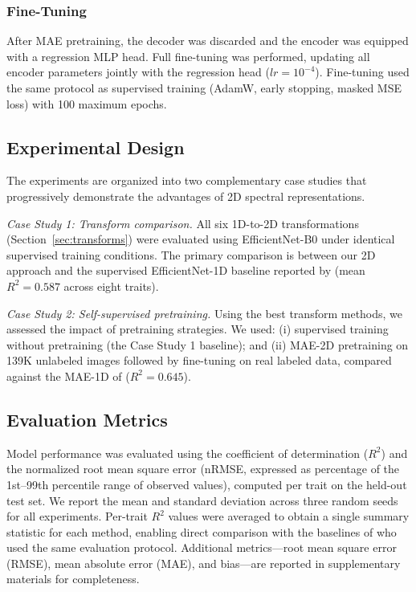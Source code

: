 \subsubsection{Fine-Tuning}

After MAE pretraining, the decoder was discarded and the encoder was equipped with a regression MLP head. Full fine-tuning was performed, updating all encoder parameters jointly with the regression head ($lr = 10^{-4}$). Fine-tuning used the same protocol as supervised training (AdamW, early stopping, masked MSE loss) with 100 maximum epochs.  


\subsection{Experimental Design}
\label{sec:experimental_design}

The experiments are organized into two complementary case studies that progressively demonstrate the advantages of 2D spectral representations.

\textit{Case Study 1: Transform comparison.} All six 1D-to-2D transformations (Section~\ref{sec:transforms}) were evaluated using EfficientNet-B0 under identical supervised training conditions. The primary comparison is between our 2D approach and the supervised EfficientNet-1D baseline reported by \citet{cherif2025greenhyperspectra} (mean $R^2 = 0.587$ across eight traits). %

\textit{Case Study 2: Self-supervised pretraining.} Using the best transform methods, we assessed the impact of pretraining strategies. We used: (i) supervised training without pretraining (the Case Study 1 baseline); and (ii) MAE-2D pretraining on 139K unlabeled images followed by fine-tuning on real labeled data, compared against the MAE-1D of \citet{cherif2025greenhyperspectra} ($R^2 = 0.645$).


\subsection{Evaluation Metrics}
\label{sec:metrics}

Model performance was evaluated using the coefficient of determination ($R^2$) and the normalized root mean square error (nRMSE, expressed as percentage of the 1st--99th percentile range of observed values), computed per trait on the held-out test set. We report the mean and standard deviation across three random seeds for all experiments. Per-trait $R^2$ values were averaged to obtain a single summary statistic for each method, enabling direct comparison with the baselines of \citet{cherif2025greenhyperspectra} who used the same evaluation protocol. Additional metrics---root mean square error (RMSE), mean absolute error (MAE), and bias---are reported in supplementary materials for completeness.

